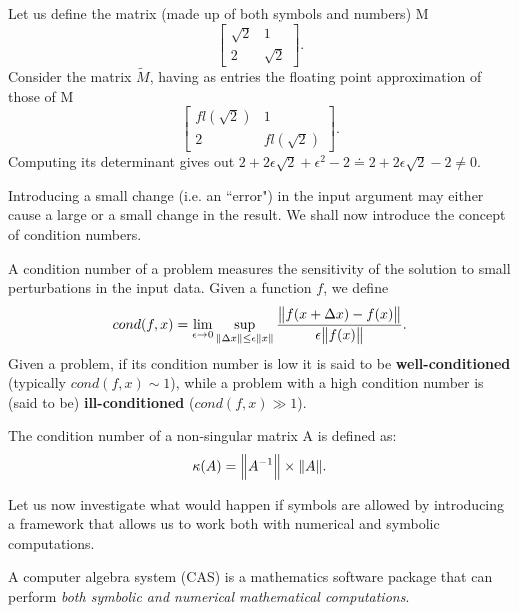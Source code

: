 \begin{example}
    Let us define the matrix (made up of both symbols and numbers) M
    \[
        \begin{bmatrix}
            \sqrt{2}  &   1    \\
                2     & \sqrt{2}
        \end{bmatrix}.
    \]
    Consider the matrix \( \tilde{M} \), having as entries the floating point approximation of those of M
    \[
        \begin{bmatrix}
            fl(\sqrt{2})      &         1      \\
                2             &    fl(\sqrt{2})
        \end{bmatrix}.
    \]
    Computing its determinant gives out \( 2  +2\epsilon\sqrt{2} + \epsilon^2 - 2 \doteq 2 + 2\epsilon\sqrt{2} -2 \neq 0 \).
\end{example}

Introducing a small change (i.e. an ``error") in the input argument may either cause a large or a small change in the result.
We shall now introduce the concept of condition numbers.

\begin{definition}
    A condition number of a problem measures the sensitivity of the solution to small perturbations in the input data.
    Given a function \(f \), we define
    \[
        cond(f, x) = \lim_{\epsilon \to 0} \sup \limits_{\norm{\Delta x} \leq \epsilon \norm{x}}
        \dfrac{\norm{f(x+\Delta x) - f(x)}}{\epsilon \norm{f(x)}}.
    \]
    Given a problem, if its condition number is low it is said to be \textbf{well-conditioned} (typically \( cond(f, x) \sim 1 \)),
    while a problem with a high condition number is (said to be) \textbf{ill-conditioned} (\( cond(f, x) \gg 1 \)).
\end{definition}

\begin{definition}
    The condition number of a non-singular matrix A is defined as:
    \[
        \kappa(A) = \norm{A^{-1}} \times \norm{A}.
    \]
\end{definition}

Let us now investigate what would happen if symbols are allowed by introducing a framework that allows us to work both with numerical
and symbolic computations.
\begin{definition}
    A computer algebra system (CAS) is a mathematics software package that can perform \textit{both symbolic and numerical
    mathematical computations}.
\end{definition}

